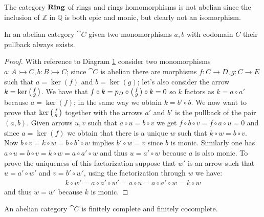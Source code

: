 \begin{remark}
  The category \(\text{\normalfont\textbf{Ring}}\) of rings and rings homomorphisms is not abelian since the inclusion of \(\mathbb{Z}\) in \(\mathbb{Q}\) is both epic and monic, but clearly not an isomorphism.
\end{remark}

\begin{proposition}
  \label{prop:existence_of_intersection }
  In an abelian category \(\cat{C}\) given two monomorphisms \(a,b\) with codomain \(C\) their pullback always exists.
\end{proposition}

\begin{figure}
  
  \caption{}
  \label{diagram:intersection}
\end{figure}

\begin{proof}
  With reference to Diagram \ref{diagram:intersection} consider two monomorphisms \(a\colon A\rightarrowtail C,b\colon B\rightarrowtail C\); since \(\cat{C}\) is abelian there are morphisms \(f\colon C\to D,g\colon C\to E\) such that \(a=\ker(f)\) and \(b=\ker(g)\); let's also consider the arrow \(k=\ker\left(\begin{smallmatrix}f\\ g\end{smallmatrix}\right)\). We have that \(f\circ k = p_D\circ\left(\begin{smallmatrix}f\\ g\end{smallmatrix}\right)\circ k = 0\) so \(k\) factors as \(k = a\circ a'\) because \(a=\ker(f)\); in the same way we obtain \(k = b'\circ b\). We now want to prove that \(\ker\left(\begin{smallmatrix}f\\ g\end{smallmatrix}\right)\) together with the arrows \(a'\) and \(b'\) is the pullback of the pair \((a, b)\). Given arrows \(u,v\) such that \(a\circ u = b\circ v\) we get \(f\circ b\circ v = f\circ a\circ u = 0\) and since \(a=\ker(f)\) we obtain that there is a unique \(w\) such that \(k\circ w = b\circ v\). Now \(b\circ v = k\circ w = b\circ b'\circ w\) implies \(b'\circ w = v\) since \(b\) is monic. Similarly one has \(a\circ u = b\circ v = k\circ w = a\circ a' \circ w\) and thus \(u=a'\circ w\) because \(a\) is also monic. To prove the uniqueness of this factorization suppose that \(w'\) is an arrow such that \(u = a'\circ w'\) and \(v = b'\circ w'\), using the factorization through \(w\) we have:
  \begin{align*}
    k\circ w' = a\circ a'\circ w' = a\circ u = a\circ a'\circ w = k\circ w
  \end{align*}
  and thus \(w = w'\) because \(k\) is monic.
\end{proof}

\begin{proposition}
  \label{prop:completeness}
  An abelian category \(\cat{C}\) is finitely complete and finitely cocomplete.
\end{proposition}


